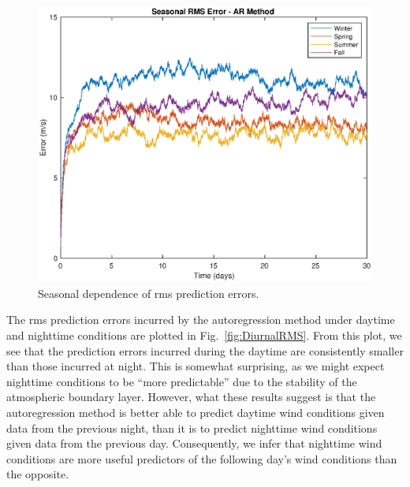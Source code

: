 \documentclass[11pt, oneside]{article}
\newcommand{\figref}[1]{Fig.~\ref{#1}}
\begin{document}
\begin{figure}[htb]
\centering
\includegraphics[width=\columnwidth]{figures/SeasonalRMSPredictionError}
\caption{Seasonal dependence of rms prediction errors.}
\label{fig:SeasonalRMS}
\end{figure}

The rms prediction errors incurred by the autoregression method under daytime and nighttime conditions are plotted in \figref{fig:DiurnalRMS}.
From this plot, we see that the prediction errors incurred during the daytime are consistently smaller than those incurred at night.
This is somewhat surprising, as we might expect nighttime conditions to be ``more predictable'' due to the stability of the atmospheric boundary layer.
However, what these results suggest is that the autoregression method is better able to predict daytime wind conditions given data from the previous night, than it is to predict nighttime wind conditions given data from the previous day.
Consequently, we infer that nighttime wind conditions are more useful predictors of the following day's wind conditions than the opposite.
\end{document}
